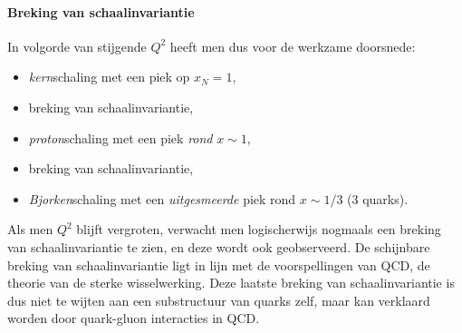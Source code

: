 \documentclass[a4paper,11pt]{article}
\numberwithin{equation}{section} %
\begin{document}
      \paragraph{Breking van schaalinvariantie}
In volgorde van stijgende $Q^2$ heeft men dus voor de werkzame doorsnede:
\begin{itemize}
  \item\textit{kern}schaling met een piek op $x_N=1$,
  \item  breking van schaalinvariantie,
  \item \textit{proton}schaling met een piek \textit{rond} $x \sim 1$,
  \item breking van schaalinvariantie,
  \item \textit{Bjorken}schaling met een \textit{uitgesmeerde} piek rond $x \sim 1/3$ (3 quarks).
\end{itemize}
Als men $Q^2$ blijft vergroten, verwacht men logischerwijs nogmaals een breking van schaalinvariantie te zien, en deze wordt ook geobserveerd.
De schijnbare breking van schaalinvariantie ligt in lijn met de voorspellingen van QCD, de theorie van de sterke wisselwerking.
Deze laatste breking van schaalinvariantie is dus niet te wijten aan een substructuur van quarks zelf, maar kan verklaard worden door quark-gluon interacties in QCD.
\end{document}
